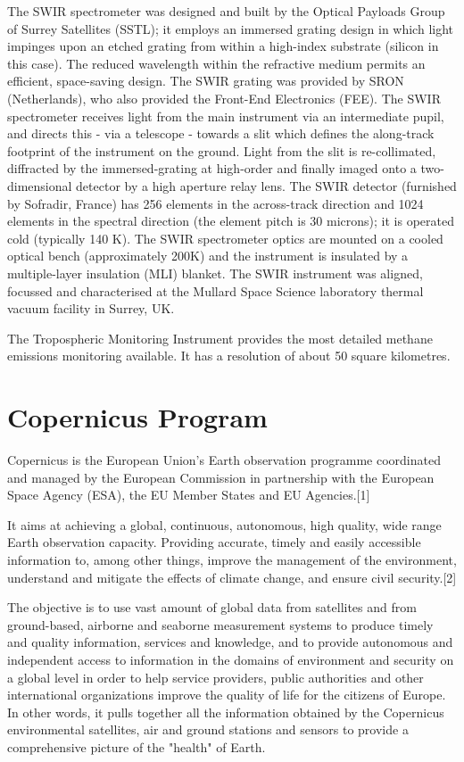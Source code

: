 \documentclass[12pt]{report}	%
\begin{document}
The SWIR spectrometer was designed and built by the Optical Payloads Group of Surrey Satellites (SSTL); it employs an immersed grating design in which light impinges upon an etched grating from within a high-index substrate (silicon in this case). The reduced wavelength within the refractive medium permits an efficient, space-saving design. The SWIR grating was provided by SRON (Netherlands), who also provided the Front-End Electronics (FEE). The SWIR spectrometer receives light from the main instrument via an intermediate pupil, and directs this - via a telescope - towards a slit which defines the along-track footprint of the instrument on the ground. Light from the slit is re-collimated, diffracted by the immersed-grating at high-order and finally imaged onto a two-dimensional detector by a high aperture relay lens. The SWIR detector (furnished by Sofradir, France) has 256 elements in the across-track direction and 1024 elements in the spectral direction (the element pitch is 30 microns); it is operated cold (typically 140 K). The SWIR spectrometer optics are mounted on a cooled optical bench (approximately 200K) and the instrument is insulated by a multiple-layer insulation (MLI) blanket. The SWIR instrument was aligned, focussed and characterised at the Mullard Space Science laboratory thermal vacuum facility in Surrey, UK.

The Tropospheric Monitoring Instrument provides the most detailed methane emissions monitoring available. It has a resolution of about 50 square kilometres.

\section{Copernicus Program}
Copernicus is the European Union's Earth observation programme coordinated and managed by the European Commission in partnership with the European Space Agency (ESA), the EU Member States and EU Agencies.[1]

It aims at achieving a global, continuous, autonomous, high quality, wide range Earth observation capacity. Providing accurate, timely and easily accessible information to, among other things, improve the management of the environment, understand and mitigate the effects of climate change, and ensure civil security.[2]

The objective is to use vast amount of global data from satellites and from ground-based, airborne and seaborne measurement systems to produce timely and quality information, services and knowledge, and to provide autonomous and independent access to information in the domains of environment and security on a global level in order to help service providers, public authorities and other international organizations improve the quality of life for the citizens of Europe. In other words, it pulls together all the information obtained by the Copernicus environmental satellites, air and ground stations and sensors to provide a comprehensive picture of the "health" of Earth.
\end{document}
